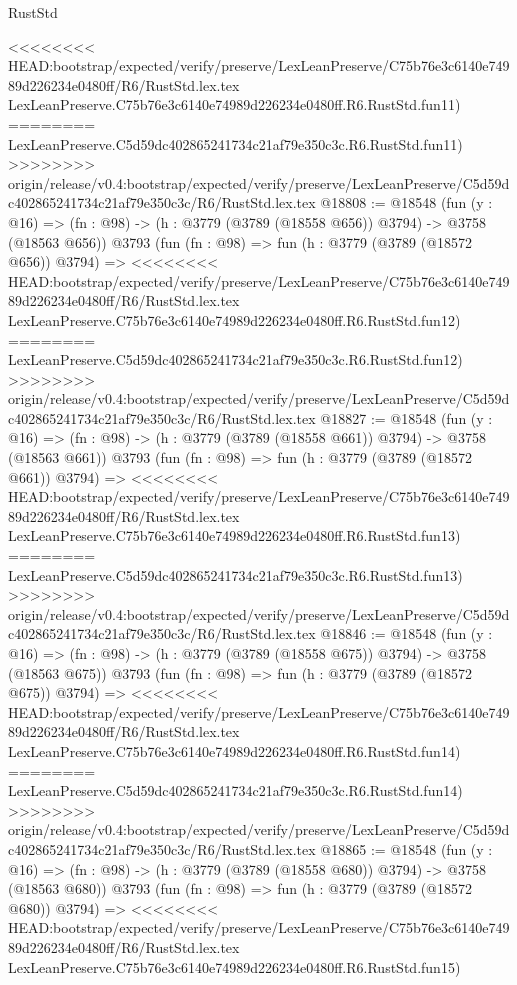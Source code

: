 \begin{lexlean}{RustStd}
\begin{coremodule}
{\begin{coremodule}
{{{{{{{{{{{{{{{{{{{{{{{{{{{{{{{<<<<<<<< HEAD:bootstrap/expected/verify/preserve/LexLeanPreserve/C75b76e3c6140e74989d226234e0480ff/R6/RustStd.lex.tex
    LexLeanPreserve.C75b76e3c6140e74989d226234e0480ff.R6.RustStd.fun11)
========
    LexLeanPreserve.C5d59dc402865241734c21af79e350c3c.R6.RustStd.fun11)
>>>>>>>> origin/release/v0.4:bootstrap/expected/verify/preserve/LexLeanPreserve/C5d59dc402865241734c21af79e350c3c/R6/RustStd.lex.tex
@18808 := @18548
    (fun (y : @16) => (fn : @98) -> (h : @3779 (@3789 (@18558 @656)) @3794) -> @3758 (@18563 @656))
    @3793
    (fun (fn : @98) =>
    fun (h : @3779 (@3789 (@18572 @656)) @3794) =>
<<<<<<<< HEAD:bootstrap/expected/verify/preserve/LexLeanPreserve/C75b76e3c6140e74989d226234e0480ff/R6/RustStd.lex.tex
    LexLeanPreserve.C75b76e3c6140e74989d226234e0480ff.R6.RustStd.fun12)
========
    LexLeanPreserve.C5d59dc402865241734c21af79e350c3c.R6.RustStd.fun12)
>>>>>>>> origin/release/v0.4:bootstrap/expected/verify/preserve/LexLeanPreserve/C5d59dc402865241734c21af79e350c3c/R6/RustStd.lex.tex
@18827 := @18548
    (fun (y : @16) => (fn : @98) -> (h : @3779 (@3789 (@18558 @661)) @3794) -> @3758 (@18563 @661))
    @3793
    (fun (fn : @98) =>
    fun (h : @3779 (@3789 (@18572 @661)) @3794) =>
<<<<<<<< HEAD:bootstrap/expected/verify/preserve/LexLeanPreserve/C75b76e3c6140e74989d226234e0480ff/R6/RustStd.lex.tex
    LexLeanPreserve.C75b76e3c6140e74989d226234e0480ff.R6.RustStd.fun13)
========
    LexLeanPreserve.C5d59dc402865241734c21af79e350c3c.R6.RustStd.fun13)
>>>>>>>> origin/release/v0.4:bootstrap/expected/verify/preserve/LexLeanPreserve/C5d59dc402865241734c21af79e350c3c/R6/RustStd.lex.tex
@18846 := @18548
    (fun (y : @16) => (fn : @98) -> (h : @3779 (@3789 (@18558 @675)) @3794) -> @3758 (@18563 @675))
    @3793
    (fun (fn : @98) =>
    fun (h : @3779 (@3789 (@18572 @675)) @3794) =>
<<<<<<<< HEAD:bootstrap/expected/verify/preserve/LexLeanPreserve/C75b76e3c6140e74989d226234e0480ff/R6/RustStd.lex.tex
    LexLeanPreserve.C75b76e3c6140e74989d226234e0480ff.R6.RustStd.fun14)
========
    LexLeanPreserve.C5d59dc402865241734c21af79e350c3c.R6.RustStd.fun14)
>>>>>>>> origin/release/v0.4:bootstrap/expected/verify/preserve/LexLeanPreserve/C5d59dc402865241734c21af79e350c3c/R6/RustStd.lex.tex
@18865 := @18548
    (fun (y : @16) => (fn : @98) -> (h : @3779 (@3789 (@18558 @680)) @3794) -> @3758 (@18563 @680))
    @3793
    (fun (fn : @98) =>
    fun (h : @3779 (@3789 (@18572 @680)) @3794) =>
<<<<<<<< HEAD:bootstrap/expected/verify/preserve/LexLeanPreserve/C75b76e3c6140e74989d226234e0480ff/R6/RustStd.lex.tex
    LexLeanPreserve.C75b76e3c6140e74989d226234e0480ff.R6.RustStd.fun15)
}}}}}}}}}}}}}}}}}}}}}}}}}}}}}}}
\end{coremodule}}
\end{coremodule}
\end{lexlean}
